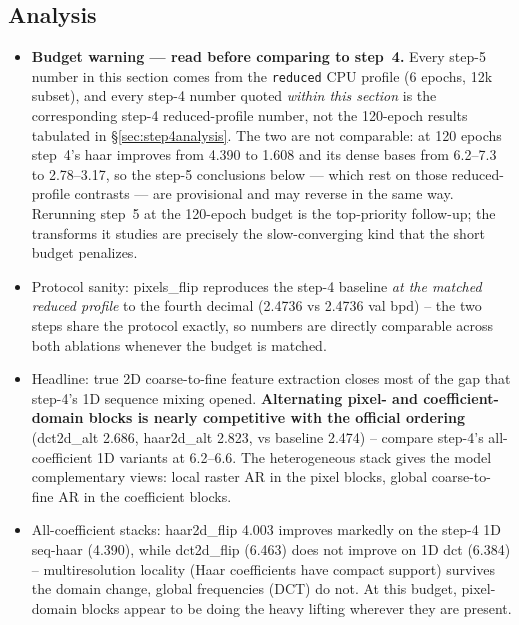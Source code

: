 \documentclass[11pt]{article}
\begin{document}
\subsection{Analysis}
\label{sec:step5analysis}
\begin{itemize}
  \item \textbf{Budget warning --- read before comparing to step~4.} Every
        step-5 number in this section comes from the \texttt{reduced} CPU
        profile (6 epochs, 12k subset), and every step-4 number quoted
        \emph{within this section} is the corresponding step-4 reduced-profile
        number, not the 120-epoch results tabulated in
        \S\ref{sec:step4analysis}. The two are not comparable: at 120 epochs
        step~4's haar improves from 4.390 to 1.608 and its dense bases from
        6.2--7.3 to 2.78--3.17, so the step-5 conclusions below --- which
        rest on those reduced-profile contrasts --- are provisional and may
        reverse in the same way. Rerunning step~5 at the 120-epoch budget is
        the top-priority follow-up; the transforms it studies are precisely
        the slow-converging kind that the short budget penalizes.
  \item Protocol sanity: pixels\_flip reproduces the step-4 baseline
        \emph{at the matched reduced profile} to the fourth decimal (2.4736
        vs 2.4736 val bpd) -- the two steps share the protocol exactly, so
        numbers are directly comparable across both ablations whenever the
        budget is matched.
  \item Headline: true 2D coarse-to-fine feature extraction closes most of
        the gap that step-4's 1D sequence mixing opened.
        \textbf{Alternating pixel- and coefficient-domain blocks is nearly
        competitive with the official ordering} (dct2d\_alt 2.686,
        haar2d\_alt 2.823, vs baseline 2.474) -- compare step-4's
        all-coefficient 1D variants at 6.2--6.6. The heterogeneous stack
        gives the model complementary views: local raster AR in the pixel
        blocks, global coarse-to-fine AR in the coefficient blocks.
  \item All-coefficient stacks: haar2d\_flip 4.003 improves markedly on the
        step-4 1D seq-haar (4.390), while dct2d\_flip (6.463) does not
        improve on 1D dct (6.384) -- multiresolution locality (Haar
        coefficients have compact support) survives the domain change,
        global frequencies (DCT) do not. At this budget, pixel-domain blocks
        appear to be doing the heavy lifting wherever they are present.

\end{itemize}
\end{document}
